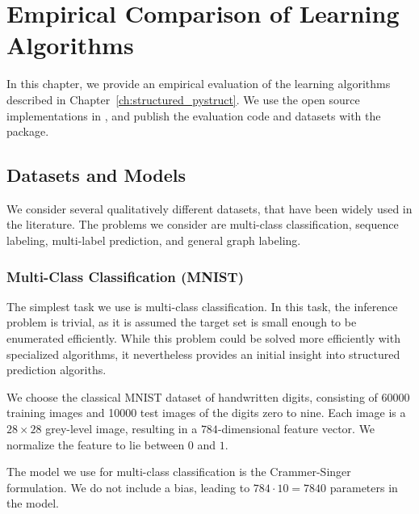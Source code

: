 \chapter{Empirical Comparison of Learning Algorithms}\label{ch:comparison}
In this chapter, we provide an empirical evaluation of the learning algorithms
described in Chapter~\ref{ch:structured_pystruct}.  We use the open source
implementations in \pystruct, and publish the evaluation code and datasets with
the package.

\section{Datasets and Models}
We consider several qualitatively different datasets, that have been widely used in the literature.
The problems we consider are multi-class classification, sequence labeling, multi-label prediction,
and general graph labeling.

\subsection{Multi-Class Classification (MNIST)}
The simplest task we use is multi-class classification. In this task,
the inference problem is trivial, as it is assumed the target set is small enough
to be enumerated efficiently. While this problem could be solved more efficiently
with specialized algorithms, it nevertheless provides an initial insight into structured
prediction algoriths.

We choose the classical MNIST dataset of handwritten digits, consisting of
60000 training images and 10000 test images of the digits zero to nine. Each
image is a $28 \times 28$ grey-level image, resulting in a $784$-dimensional
feature vector. We normalize the feature to lie between $0$ and $1$.

The model we use for multi-class classification is the Crammer-Singer
formulation. We do not include a bias, leading to $784 \cdot 10 = 7840$
parameters in the model.


